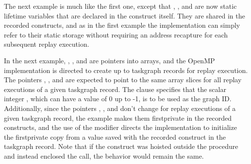 
The next example is much like the first one, except that , ,
and  are now static lifetime variables that are declared in the
 construct itself. They are shared in the recorded
 constructs, and as in the first example the implementation can
simply refer to their static storage without requiring an address recapture for
each subsequent replay execution.



In the next example, , , and  are pointers into
 arrays, and the OpenMP implementation is directed to
create up to  taskgraph records for replay execution. The pointers
, , and  are expected to point to the same array
slices for all replay executions of a given taskgraph record. The
 clause specifies that the scalar integer ,
which can have a value of 0 up to -1, is to be used as the graph ID.
Additionally, since the pointers , , and  don't
change for replay executions of a given taskgraph record, the example makes
them firstprivate in the recorded  constructs, and the use of the
 modifier directs the implementation to initialize the
firstprivate copy from a value saved with the recorded  construct
in the taskgraph record. Note that if the  construct was
hoisted outside the  procedure and instead enclosed the
call, the behavior would remain the same.


